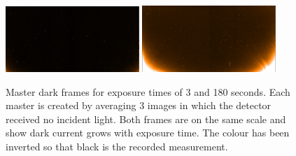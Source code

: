 \begin{figure}[h]
    \centering
    \includegraphics[width=0.45\textwidth]{figures/reduction/MasterDarkFlat_1.png}
    \includegraphics[width=0.45\textwidth]{figures/reduction/MasterDarkSpec_1.png}
    \caption{Master dark frames for exposure times of 3 and 180 seconds.
Each master is created by averaging 3 images in which the detector received no incident light.
Both frames are on the same scale and show dark current grows with exposure time.
The colour has been inverted so that black is the recorded measurement.}
    \label{fig:darkcurrent_colour}
\end{figure}

